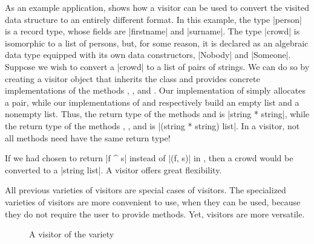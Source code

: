 \documentclass[11pt,a4paper,twoside]{article}
\begin{document}
As an example application,  shows how a \fold visitor can be
used to convert the visited data structure to an entirely different format. In
this example, the type \oc|person| is a record type, whose fields are
\oc|firstname| and \oc|surname|. The type \oc|crowd| is isomorphic to a list
of persons, but, for some reason, it is declared as an algebraic data type
equipped with its own data constructors, \oc|Nobody| and \oc|Someone|. Suppose
we wish to convert a \oc|crowd| to a list of pairs of strings. We can do so by
creating a visitor object that inherits the class \fold and provides concrete
implementations of the methods ,
, and .
Our implementation of  simply allocates
a pair, while our implementations of
 and 
respectively build an empty list and a nonempty list.
Thus, the return type of the methods 
and  is \oc|string * string|,
while the return type of the methods ,
, and  is
\oc|(string * string) list|. In a \fold visitor, not all methods
need have the same return type!

If we had chosen to return \oc|f ^ s| instead of \oc|(f, s)| in
, then a crowd would be converted to
a \oc|string list|. A \fold visitor offers great flexibility.

All previous varieties of visitors are special cases of \fold visitors. The
specialized varieties of visitors are more convenient to use, when they can be
used, because they do not require the user to provide \tyconascendingmethod{}
methods. Yet, \fold visitors are more versatile.



\begin{figure}[p]
\vspace{-\baselineskip}
\caption{A visitor of the \itertwo variety}
\label{fig:expr02}
\end{figure}
\end{document}
